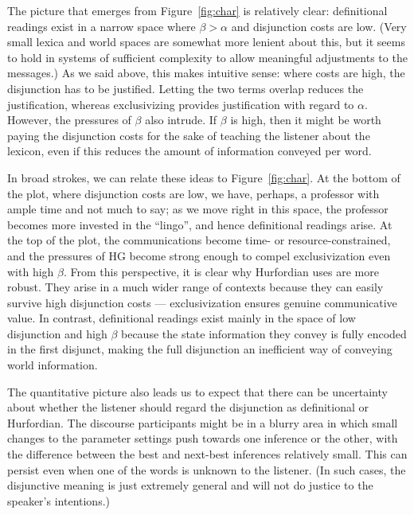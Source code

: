 \documentclass[12pt,twoside]{article}
\newcommand{\figref}[1]{Figure~\ref{#1}}
\renewcommand{\_}{\textbf{\textunderscore\hspace{-4pt}\textunderscore\hspace{-3pt}\textunderscore\hspace{-4pt}\textunderscore}\hspace{0.5pt}}			%
\begin{document}
The picture that emerges from \figref{fig:char} is relatively clear:
definitional readings exist in a narrow space where $\beta > \alpha$
and disjunction costs are low. (Very small lexica and world spaces are
somewhat more lenient about this, but it seems to hold in systems of
sufficient complexity to allow meaningful adjustments to the
messages.) As we said above, this makes intuitive sense: where costs
are high, the disjunction has to be justified. Letting the two terms
overlap reduces the justification, whereas exclusivizing provides
justification with regard to $\alpha$. However, the pressures of
$\beta$ also intrude. If $\beta$ is high, then it might be worth
paying the disjunction costs for the sake of teaching the listener
about the lexicon, even if this reduces the amount of information
conveyed per word. 

In broad strokes, we can relate these ideas to \figref{fig:char}. At
the bottom of the plot, where disjunction costs are low, we have,
perhaps, a professor with ample time and not much to say; as we move
right in this space, the professor becomes more invested in the
``lingo'', and hence definitional readings arise.  At the top of the
plot, the communications become time- or resource-constrained, and the
pressures of HG become strong enough to compel exclusivization even
with high $\beta$. From this perspective, it is clear why Hurfordian
uses are more robust. They arise in a much wider range of contexts
because they can easily survive high disjunction costs ---
exclusivization ensures genuine communicative value. In contrast,
definitional readings exist mainly in the space of low disjunction and
high $\beta$ because the state information they convey is fully
encoded in the first disjunct, making the full disjunction an
inefficient way of conveying world information.

The quantitative picture also leads us to expect that there can be
uncertainty about whether the listener should regard the disjunction
as definitional or Hurfordian. The discourse participants might be in
a blurry area in which small changes to the parameter settings push
towards one inference or the other, with the difference between the
best and next-best inferences relatively small. This can persist even
when one of the words is unknown to the listener. (In such cases, the
disjunctive meaning is just extremely general and will not do justice
to the speaker's intentions.)
\end{document}
